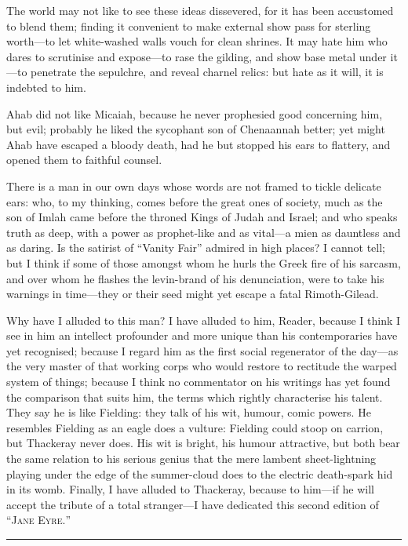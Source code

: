 The world may not like to see these ideas dissevered, for it has been
accustomed to blend them; finding it convenient to make external show
pass for sterling worth---to let white-washed walls vouch for clean
shrines.  It may hate him who dares to scrutinise and expose---to rase
the gilding, and show base metal under it---to penetrate the sepulchre,
and reveal charnel relics: but hate as it will, it is indebted to him.

Ahab did not like Micaiah, because he never prophesied good concerning
him, but evil; probably he liked the sycophant son of Chenaannah better;
yet might Ahab have escaped a bloody death, had he but stopped his ears
to flattery, and opened them to faithful counsel.

There is a man in our own days whose words are not framed to tickle
delicate ears: who, to my thinking, comes before the great ones of
society, much as the son of Imlah came before the throned Kings of Judah
and Israel; and who speaks truth as deep, with a power as prophet-like
and as vital---a mien as dauntless and as daring.  Is the satirist of
\enquote{Vanity Fair} admired in high places?  I cannot tell; but I
think if some of those amongst whom he hurls the Greek fire of his
sarcasm, and over whom he flashes the levin-brand of his denunciation,
were to take his warnings in time---they or their seed might yet escape
a fatal Rimoth-Gilead.

Why have I alluded to this man?  I have alluded to him, Reader, because
I think I see in him an intellect profounder and more unique than his
contemporaries have yet recognised; because I regard him as the first
social regenerator of the day---as the very master of that working corps
who would restore to rectitude the warped system of things; because I
think no commentator on his writings has yet found the comparison that
suits him, the terms which rightly characterise his talent.  They say he
is like Fielding: they talk of his wit, humour, comic powers.  He
resembles Fielding as an eagle does a vulture: Fielding could stoop on
carrion, but Thackeray never does.  His wit is bright, his humour
attractive, but both bear the same relation to his serious genius that
the mere lambent sheet-lightning playing under the edge of the
summer-cloud does to the electric death-spark hid in its womb.  Finally,
I have alluded to \Mr{} Thackeray, because to him---if he will accept the
tribute of a total stranger---I have dedicated this second edition of \enquote{\textsc{Jane Eyre.}}

\plainbreak{2}


